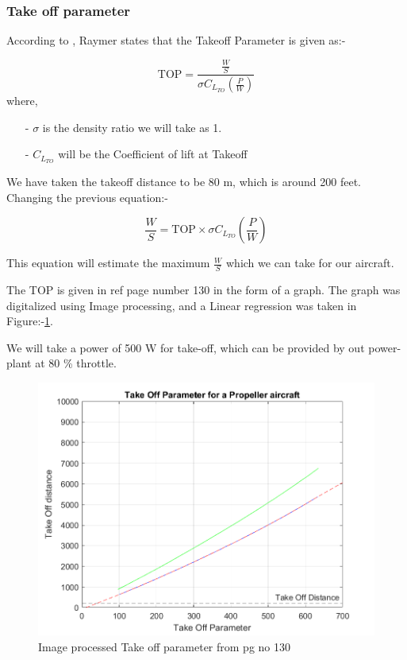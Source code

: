 \documentclass[12 pt]{article}
\begin{document}

\subsubsection{Take off parameter}

According to \cite{Raymer.2006}, Raymer states that the Takeoff Parameter is given as:- 

$$\text{TOP} = \frac{\frac{W}{S}}{ \sigma C_{L_{TO}} \left( \frac{P}{W} \right) }$$
where,
\begin{itemize}
    \item[-] $\sigma$ is the density ratio we will take as 1.
    \item [-] $C_{L_{TO}}$ will be the Coefficient of lift at Takeoff 
\end{itemize}

We have taken the takeoff distance to be 80 m, which is around 200 feet. Changing the previous equation:-

$$ \frac{W}{S} = \text{TOP} \times \sigma C_{L_{TO}} \left( \frac{P}{W} \right) $$

This equation will estimate the maximum $\frac{W}{S}$ which we can take for our aircraft.

The TOP is given in ref \cite{Raymer.2006} page number 130 in the form of a graph. The graph was digitalized using Image processing, and a Linear regression was taken in Figure:-\ref{Image processed Take off parameter}. 

We will take a power of 500 W for take-off, which can be provided by out power-plant at 80 \% throttle. 

\begin{figure}[h]
    \centering
    \includegraphics[width=0.8\linewidth]{Codes/Week 2/Takeoffparam.png}
    \caption{Image processed Take off parameter from \protect\cite{Raymer.2006} pg no 130}
    \label{Image processed Take off parameter}
\end{figure}
\end{document}
